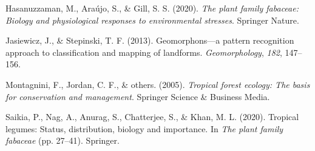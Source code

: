 \documentclass[11pt,]{article}
\begin{document}
\hypertarget{ref-hasanuzzaman2020plant}{}
Hasanuzzaman, M., Araújo, S., \& Gill, S. S. (2020). \emph{The plant
family fabaceae: Biology and physiological responses to environmental
stresses}. Springer Nature.

\hypertarget{ref-jasiewicz2013geomorphons}{}
Jasiewicz, J., \& Stepinski, T. F. (2013). Geomorphons---a pattern
recognition approach to classification and mapping of landforms.
\emph{Geomorphology}, \emph{182}, 147--156.

\hypertarget{ref-montagnini2005tropical}{}
Montagnini, F., Jordan, C. F., \& others. (2005). \emph{Tropical forest
ecology: The basis for conservation and management}. Springer Science \&
Business Media.

\hypertarget{ref-saikia2020tropical}{}
Saikia, P., Nag, A., Anurag, S., Chatterjee, S., \& Khan, M. L. (2020).
Tropical legumes: Status, distribution, biology and importance. In
\emph{The plant family fabaceae} (pp. 27--41). Springer.




\newpage
\singlespacing 
\end{document}
